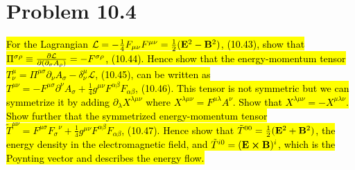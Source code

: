 \documentclass{article}
\begin{document}
\section*{Problem 10.4}
\begin{quoting}
  \hl{For the Lagrangian $\mathcal{L}=-\frac{1}{4}F_{\mu\nu}F^{\mu\nu}=\frac{1}{2}(\vb{E}^2-\vb{B}^2)$, (10.43), show that $\Pi^{\sigma\rho}\equiv\pdv{\mathcal{L}}{(\partial_\sigma A_\rho)}=-F^{\sigma\rho}$, (10.44). Hence show that the energy-momentum tensor $T^\mu_\nu=\Pi^{\mu\sigma} \partial_\nu A_\sigma-\delta^\mu_\nu \mathcal{L}$, (10.45), can be written as\\ $T^{\mu\nu}=-F^{\mu\sigma}\partial^\nu A_\sigma+\frac{1}{4}g^{\mu\nu}F^{\alpha\beta}F_{\alpha\beta}$, (10.46). This tensor is not symmetric but we can symmetrize it by adding $\partial_\lambda X^{\lambda\mu\nu}$ where $X^{\lambda\mu\nu}=F^{\mu\lambda}A^\nu$. Show that $X^{\lambda\mu\nu}=-X^{\mu\lambda\nu}$. Show further that the symmetrized energy-momentum tensor $\tilde{T}^{\mu\nu}=F^{\mu\sigma}{F_\sigma}^\nu+\frac{1}{4}g^{\mu\nu}F^{\alpha\beta}F_{\alpha\beta}$, (10.47). Hence show that $\tilde{T}^{00}=\frac{1}{2}(\vb{E}^2+\vb{B}^2)$, the energy density in the electromagnetic field, and $\tilde{T}^{i0}=(\vb{E}\cross\vb{B})^i$, which is the Poynting vector and describes the energy flow.}
\end{quoting}
\end{document}
